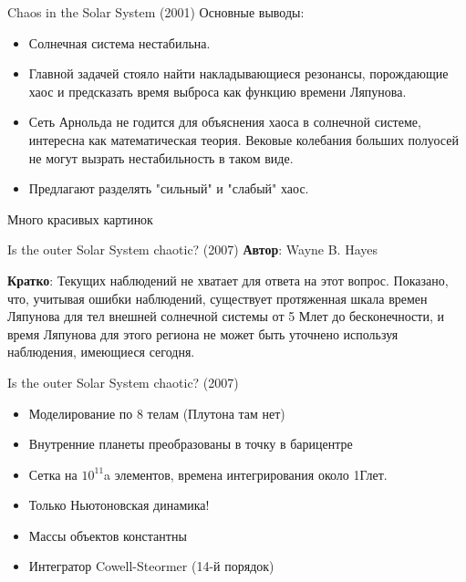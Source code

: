 \documentclass{beamer}
\begin{document}
\begin{frame}{Chaos in the Solar System (2001)}
        Основные выводы:
        \begin{itemize}
                \item Солнечная система нестабильна.
                \item Главной задачей стояло найти накладывающиеся резонансы, порождающие хаос и предсказать время выброса как функцию времени Ляпунова. 
                \item Сеть Арнольда не годится для объяснения хаоса в солнечной системе, интересна как математическая теория. Вековые колебания больших полуосей не могут вызрать нестабильность в таком виде.
                \item Предлагают разделять "сильный" и "слабый" хаос.
        \end{itemize}
        Много красивых картинок
\end{frame}


\begin{frame}{Is the outer Solar System chaotic? (2007)}
        \textbf{Автор}: Wayne B. Hayes

        \textbf{Кратко}: Текущих наблюдений не хватает для ответа на этот вопрос. Показано, что, учитывая ошибки наблюдений, существует протяженная шкала времен Ляпунова для тел внешней солнечной системы от 5 Млет до бесконечности, и время Ляпунова для этого региона не может быть уточнено используя наблюдения, имеющиеся сегодня.
\end{frame}


\begin{frame}{Is the outer Solar System chaotic? (2007)}
        \begin{itemize}
                \item Моделирование по 8 телам (Плутона там нет)
                \item Внутренние планеты преобразованы в точку в барицентре
                \item Сетка на $10^{11}$a элементов, времена интегрирования около 1Глет.
                \item Только Ньютоновская динамика!
                \item Массы объектов константны
                \item Интегратор Cowell-Steormer (14-й порядок)
        \end{itemize}
\end{frame}
\end{document}
